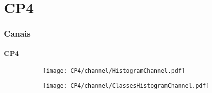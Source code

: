 \documentclass{beamer}
\begin{document}




	






\section{CP4}

\begin{frame}
\frametitle{Canais}
\framesubtitle{CP4}

\begin{figure}
	
	\begin{subfigure}{.5\textwidth}
		\centering
		\texttt{[image: CP4/channel/HistogramChannel.pdf]}
	\end{subfigure}%
	\begin{subfigure}{.5\textwidth}
		\centering
		\texttt{[image: CP4/channel/ClassesHistogramChannel.pdf]}
	\end{subfigure}
\end{figure}

\end{frame}
\end{document}
